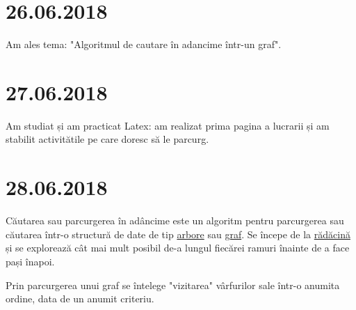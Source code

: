 \documentclass{report}
\begin{document}
 


\chapter{26.06.2018}
Am ales tema: "Algoritmul de cautare în adancime într-un graf".
\chapter{27.06.2018}
Am studiat și am practicat Latex: am realizat prima pagina a lucrarii și am stabilit activitătile pe care doresc să le parcurg.

\chapter{28.06.2018}

Căutarea sau parcurgerea în adâncime este un algoritm pentru parcurgerea sau căutarea într-o structură de date de tip \underline{arbore} sau \underline{graf}. Se începe de la \underline{rădăcină} și se explorează cât mai mult posibil de-a lungul fiecărei ramuri înainte de a face pași înapoi.

Prin parcurgerea unui graf se întelege "vizitarea" vârfurilor sale într-o anumita ordine, data de un anumit criteriu.
\end{document}
